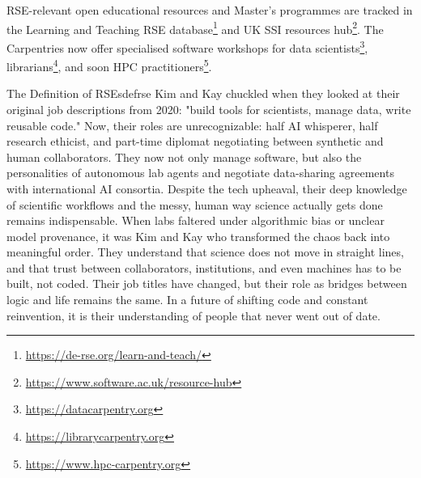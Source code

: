 \documentclass{eceasst}
\begin{document}
RSE-relevant open educational resources and Master's programmes are tracked
in the Learning and Teaching RSE database\footnote{\url{https://de-rse.org/learn-and-teach/}}
and UK SSI resources hub\footnote{\url{https://www.software.ac.uk/resource-hub}}.
The Carpentries now offer specialised software workshops
for data scientists\footnote{\url{https://datacarpentry.org}},
librarians\footnote{\url{https://librarycarpentry.org}},
and soon HPC practitioners\footnote{\url{https://www.hpc-carpentry.org}}.

\begin{story}{The Definition of RSEs}{defrse}
Kim and Kay chuckled when they looked at their original job descriptions from 2020: "build tools for scientists, manage data, write reusable code."
Now, their roles are unrecognizable: half AI whisperer, half research ethicist, and part-time diplomat negotiating between synthetic and human collaborators.
They now not only manage software, but also the personalities of autonomous lab agents and negotiate data-sharing agreements with international AI consortia.
Despite the tech upheaval, their deep knowledge of scientific workflows and the messy, human way science actually gets done remains indispensable.
When labs faltered under algorithmic bias or unclear model provenance, it was Kim and Kay who transformed the chaos back into meaningful order.
They understand that science does not move in straight lines, and that trust between collaborators, institutions, and even machines has to be built, not coded.
Their job titles have changed, but their role as bridges between logic and life remains the same.
In a future of shifting code and constant reinvention, it is their understanding of people that never went out of date.

\end{story}
\end{document}
